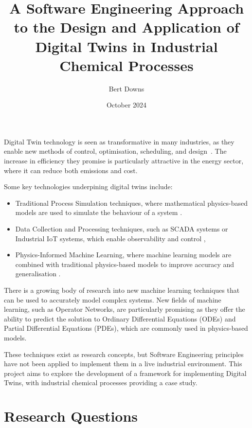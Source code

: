 \documentclass[12pt]{article}
\title{A Software Engineering Approach to the Design and Application of Digital Twins in Industrial Chemical Processes}
\author{Bert Downs }
\date{October 2024}
\begin{document}
\maketitle

Digital Twin technology is seen as transformative in many industries, as they enable new methods of control, optimisation, scheduling, and design~\cite{walmsley2024adaptive}. The increase in efficiency they promise is particularly attractive in the energy sector, where it can reduce both emissions and cost.

Some key technologies underpining digital twins include:

\begin{itemize}
    \item Traditional Process Simulation techniques, where mathematical physics-based models are used to simulate the behaviour of a system \cite{lee2021idaes}.
    \item Data Collection and Processing techniques, such as SCADA systems or Industrial IoT systems, which enable observability and control \cite{udugama2020role},
    \item Physics-Informed Machine Learning, where machine learning models are combined with traditional physics-based models to improve accuracy and generalisation \cite{karniadakis2021physics}.
\end{itemize}

There is a growing body of research into new machine learning techniques that can be used to accurately model complex systems. New fields of machine learning, such as Operator Networks, are particularly promising as they offer the ability to predict the solution to Ordinary Differential Equations (ODEs) and Partial Differential Equations (PDEs)\cite{lu2019deeponet}, which are commonly used in physics-based models.

These techniques exist as research concepts, but Software Engineering principles have not been applied to implement them in a live industrial environment. This project aims to explore the development of a framework for implementing Digital Twins, with industrial chemical processes providing a case study.

\section*{Research Questions}

\end{document}

